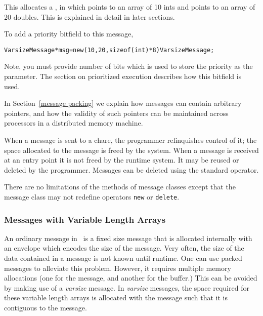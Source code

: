 This allocates a , in which  points to an
array of 10 ints and  points to an array of 20 doubles.  This
is explained in detail in later sections. 

To add a priority bitfield to this message, 

\begin{alltt}
VarsizeMessage *msg = new (10, 20, sizeof(int)*8) VarsizeMessage;
\end{alltt}

Note, you must provide number of bits which is used to store the priority as
the  parameter. The section on prioritized execution describes how
this bitfield is used.

In Section~\ref{message packing} we explain how messages can contain arbitrary
pointers, and how the validity of such pointers can be maintained across
processors in a distributed memory machine.

When a message  is sent to a chare, the programmer
relinquishes control of it; the space allocated to the message is freed by the
system.  When a message is received at an entry point it is not freed by the
runtime system.  It may be reused or deleted by the programmer.  Messages can
be deleted using the standard \CC{}  operator.  

There are no limitations of the methods of message classes except that the
message class may not redefine operators \texttt{new} or \texttt{delete}.


\subsubsection{Messages with Variable Length Arrays}

\label{varsize messages}

An ordinary message in \charmpp\ is a fixed size message that is allocated
internally with an envelope which encodes the size of the message. Very often,
the size of the data contained in a message is not known until runtime. One can
use packed messages to alleviate this problem.  However,
it requires multiple memory allocations (one for the message, and another for
the buffer.) This can be avoided by making use of a \emph{varsize} message.
In \emph{varsize} messages, the space required for these variable length arrays
is allocated with the message such that it is contiguous to the message.

